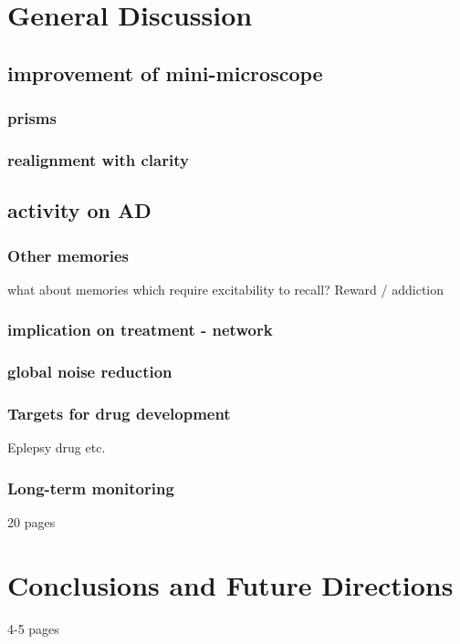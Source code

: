 \chapter{General Discussion}
\section{improvement of mini-microscope}
\subsection{prisms}
\subsection{realignment with clarity}
\section{activity on AD}
\subsection{Other memories}
what about memories which require excitability to recall?
Reward / addiction
\subsection{implication on treatment - network}
\subsection{global noise reduction}
\subsection{Targets for drug development}
Eplepsy drug etc.
\subsection{Long-term monitoring}

20 pages

\chapter{Conclusions and Future Directions}
4-5 pages
